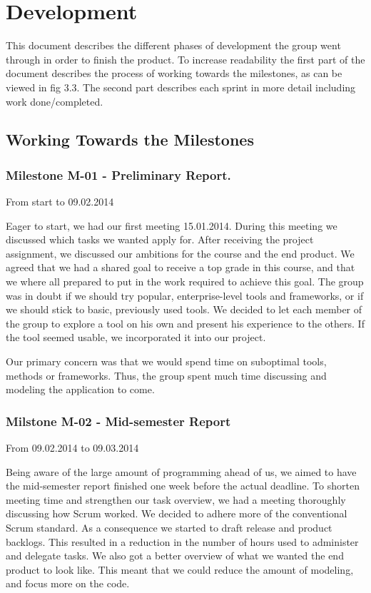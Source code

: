 \chapter{Development}

This document describes the different phases of development the group
went through in order to finish the product. To increase readability
the first part of the document describes the process of working towards the
milestones, as can be viewed in fig 3.3. The second part describes
each sprint in more detail including work done/completed. 

\section{Working Towards the Milestones}
\subsection{Milestone M-01 - Preliminary Report.}
\label{sec:M01}

From start to 09.02.2014

Eager to start, we had our first meeting 15.01.2014. During this meeting
we discussed which tasks we wanted apply for.
After receiving the project assignment, we discussed our ambitions for
the course and the end product. We agreed that we had a shared goal to
receive a top grade in this course, and that we where all prepared to put 
in the work required to achieve this goal. The group was in doubt
if we should try popular, enterprise-level tools and frameworks, or if
we should stick to basic, previously used tools. We decided to let each
member of the group to explore a tool on his own and present his
experience to the others. If the tool seemed usable, we incorporated it
into our project.

Our primary concern was that we would spend time on suboptimal tools,
methods or frameworks. Thus, the group spent much time discussing and
modeling the application to come. 

\subsection{Milstone M-02 - Mid-semester Report}
\label{sec:M02}
From 09.02.2014 to 09.03.2014

Being aware of the large amount of programming ahead of us, we aimed to
have the mid-semester report finished one week before the actual
deadline. To shorten meeting time and strengthen our task overview, we had a
meeting thoroughly discussing how Scrum worked. We decided to adhere
more of the conventional Scrum standard. As a consequence we started to
draft release and product backlogs. This resulted in a reduction in the number
of hours used to administer and delegate tasks. We also got a
better overview of what we wanted the end product to look like. This meant that we could
reduce the amount of modeling, and focus more on the code. 


